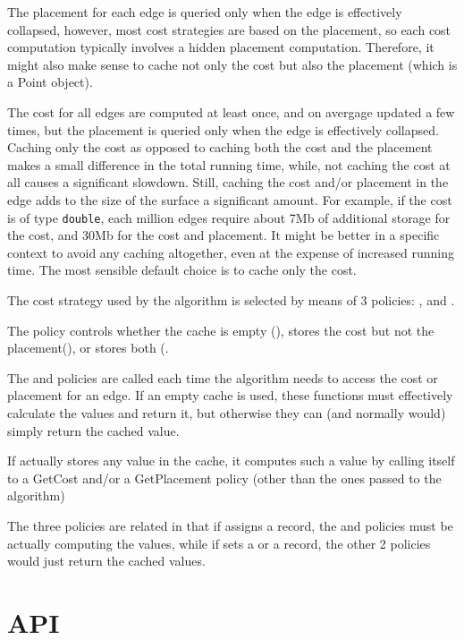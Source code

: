 The placement for each edge is queried only when the edge is effectively collapsed, 
however, most cost strategies are based on the placement, so each cost computation 
typically involves a hidden placement computation. Therefore, it might also make sense
to cache not only the cost but also the placement (which is a Point object).

The cost for all edges are computed at least once, and on avergage updated a few times,
but the placement is queried only when the edge is effectively collapsed. Caching only
the cost as opposed to caching both the cost and the placement makes a small difference
in the total running time, while, not caching the cost at all causes a significant slowdown.
Still, caching the cost and/or placement in the edge adds to the size of the surface 
a significant amount. For example, if the cost is of type {\tt double}, each million edges
require about 7Mb of additional storage for the cost, and 30Mb for the cost and placement.
It might be better in a specific context to avoid any caching altogether, even 
at the expense of increased running time. The most sensible default choice is to cache
only the cost.

The cost strategy used by the algorithm is selected by means of 3 policies: 
,  and . 

The  policy controls whether the cache is empty (), 
stores the cost but not the placement(), or stores both 
(.

The  and  policies are called each time
the algorithm needs to access the cost or placement for an edge.
If an empty cache is used, these functions must effectively
calculate the values and return it, but otherwise they can 
(and normally would) simply return the cached value.

If  actually stores any value in the cache, it computes
such a value by calling itself to a GetCost and/or a GetPlacement
policy (other than the ones passed to the algorithm)

The three policies are related in that if 
assigns a  record, the  and  policies
must be actually computing the values, while if  sets a 
 or a  record, 
the other 2 policies would just return the cached values.

\section{API}

